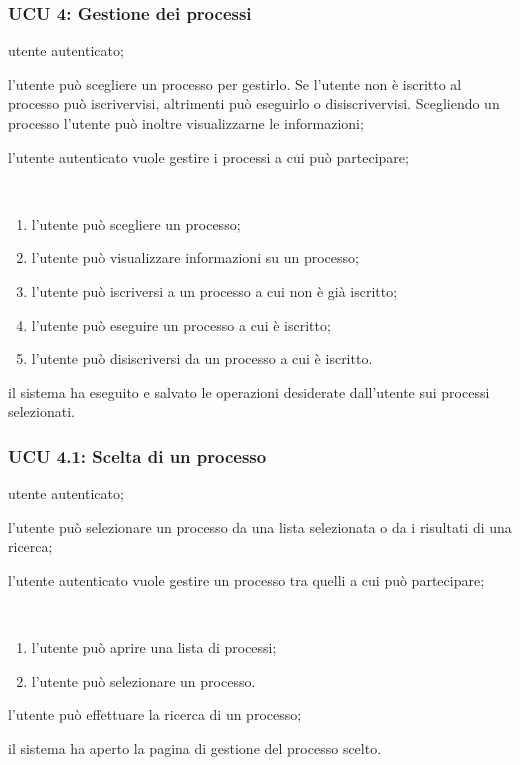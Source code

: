 \subsubsection{UCU 4: Gestione dei processi}
\begin{description}[leftmargin=0cm]
\item[Attori:] utente autenticato;
\item[Descrizione:] l'utente può scegliere un processo per gestirlo.
Se l'utente non è iscritto al processo può iscrivervisi, altrimenti può eseguirlo o disiscrivervisi.
Scegliendo un processo l'utente può inoltre visualizzarne le informazioni;
\item[Precondizione:] l'utente autenticato vuole gestire i processi a cui può partecipare;
\item[Scenario principale:]\
\begin{enumerate}
\item l'utente può scegliere un processo;
\item l'utente può visualizzare informazioni su un processo;
\item l'utente può iscriversi a un processo a cui non è già iscritto;
\item l'utente può eseguire un processo a cui è iscritto;
\item l'utente può disiscriversi da un processo a cui è iscritto.
\end{enumerate}
\item[Postcondizione:] il sistema ha eseguito e salvato le operazioni desiderate dall'utente sui processi selezionati.
\end{description}

\subsubsection{UCU 4.1: Scelta di un processo}
\begin{description}[leftmargin=0cm]
\item[Attori:] utente autenticato;
\item[Descrizione:] l'utente può selezionare un processo da una lista selezionata o da i risultati di una ricerca;
\item[Precondizione:] l'utente autenticato vuole gestire un processo tra quelli a cui può partecipare;
\item[Flusso principale degli eventi:]\
\begin{enumerate}
\item l'utente può aprire una lista di processi;
\item l'utente può selezionare un processo.
\end{enumerate}
\item[Estensioni:] l'utente può effettuare la ricerca di un processo;
\item[Postcondizione:] il sistema ha aperto la pagina di gestione del processo scelto.
\end{description}

